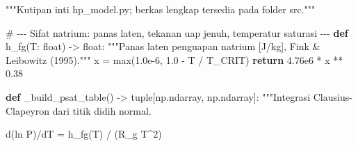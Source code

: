 \documentclass[
  indonesian,
  12pt,
  a4paper,
]{report}
\newenvironment{Shaded}{\begin{snugshade}}{\end{snugshade}}
\newcommand{\BuiltInTok}[1]{\textcolor[rgb]{0.00,0.23,0.31}{#1}}
\newcommand{\CommentTok}[1]{\textcolor[rgb]{0.37,0.37,0.37}{#1}}
\newcommand{\ControlFlowTok}[1]{\textcolor[rgb]{0.00,0.23,0.31}{\textbf{#1}}}
\newcommand{\FloatTok}[1]{\textcolor[rgb]{0.68,0.00,0.00}{#1}}
\newcommand{\KeywordTok}[1]{\textcolor[rgb]{0.00,0.23,0.31}{\textbf{#1}}}
\newcommand{\NormalTok}[1]{\textcolor[rgb]{0.00,0.23,0.31}{#1}}
\newcommand{\OperatorTok}[1]{\textcolor[rgb]{0.37,0.37,0.37}{#1}}
\begin{document}
\begin{Shaded}
\begin{Highlighting}[]
\CommentTok{"""Kutipan inti hp\_model.py; berkas lengkap tersedia pada folder src."""}

\CommentTok{\# {-}{-}{-} Sifat natrium: panas laten, tekanan uap jenuh, temperatur saturasi {-}{-}{-}}
\KeywordTok{def}\NormalTok{ h\_fg(T: }\BuiltInTok{float}\NormalTok{) }\OperatorTok{{-}\textgreater{}} \BuiltInTok{float}\NormalTok{:}
    \CommentTok{"""Panas laten penguapan natrium [J/kg], Fink \& Leibowitz (1995)."""}
\NormalTok{    x }\OperatorTok{=} \BuiltInTok{max}\NormalTok{(}\FloatTok{1.0e{-}6}\NormalTok{, }\FloatTok{1.0} \OperatorTok{{-}}\NormalTok{ T }\OperatorTok{/}\NormalTok{ T\_CRIT)}
    \ControlFlowTok{return} \FloatTok{4.76e6} \OperatorTok{*}\NormalTok{ x }\OperatorTok{**} \FloatTok{0.38}


\KeywordTok{def}\NormalTok{ \_build\_psat\_table() }\OperatorTok{{-}\textgreater{}} \BuiltInTok{tuple}\NormalTok{[np.ndarray, np.ndarray]:}
    \CommentTok{"""Integrasi Clausius{-}Clapeyron dari titik didih normal.}

\CommentTok{    d(ln P)/dT = h\_fg(T) / (R\_g T\^{}2)}


\end{Highlighting}
\end{Shaded}
\end{document}
